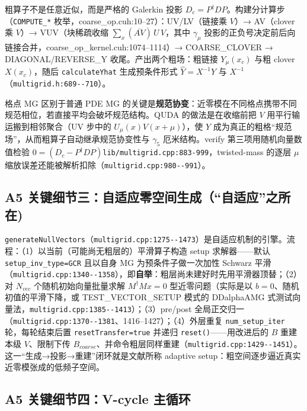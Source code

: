 \documentclass[UTF8]{ctexart}
\begin{document}
粗算子不是任意近似，而是严格的 Galerkin 投影 $D_c=P^\dagger D P$。构建分计算步（\texttt{COMPUTE\_*} 枚举，coarse\_op.cuh:10--27）：UV/LV（链接乘 $V$）→ AV（clover 乘 $V$）→ VUV（块稀疏收缩 $\sum_x (\overline{AV})\,U\,V$，其中 $\gamma_\mu$ 投影的正负号决定前后向链接合并，coarse\_op\_kernel.cuh:1074--1114）→ COARSE\_CLOVER → DIAGONAL/REVERSE\_Y 收尾。产出两个粗场：粗链接 $Y_\mu(x_c)$ 与粗 clover $X(x_c)$，随后 \texttt{calculateYhat} 生成预条件形式 $\hat Y=X^{-1}Y$ 与 $X^{-1}$（\textcolor{evidence}{\texttt{\nolinkurl{multigrid.h:689--710}}}）。

\textcolor{idea}{格点 MG 区别于普通 PDE MG 的关键是\textbf{规范协变}：近零模在不同格点携带不同规范相位，若直接平均会破坏规范结构。QUDA 的做法是在收缩前把 $V$ 用平行输运搬到相邻聚合（UV 步中的 $U_\mu(x)V(x+\mu)$），使 $Y$ 成为真正的粗格``规范场''，从而粗算子自动继承规范协变性与 $\gamma_5$ 厄米结构。}verify 第三项用随机向量数值检验 $0=(D_c-P^\dagger DP)$\textcolor{evidence}{\texttt{\nolinkurl{lib/multigrid.cpp:883-999}}}，twisted-mass 的逐层 $\mu$ 缩放误差还能被解析扣除（\textcolor{evidence}{\texttt{\nolinkurl{multigrid.cpp:980--991}}}）。

\subsection{A5 关键细节三：自适应零空间生成（``自适应''之所在)}

\texttt{generateNullVectors}（\textcolor{evidence}{\texttt{\nolinkurl{multigrid.cpp:1275--1473}}}）是自适应机制的引擎。流程：（1）以当前（可能尚无粗层的）平滑算子构造 setup 求解器——默认 \texttt{setup\_inv\_type=GCR} 且以自身 MG 为预条件子做一次加性 Schwarz 平滑（\textcolor{evidence}{\texttt{\nolinkurl{multigrid.cpp:1340--1358}}}），即\textbf{自举}：粗层尚未建好时先用平滑器顶替；（2）对 $N_{vec}$ 个随机初始向量批量求解 $M^\dagger M x=0$ 型近零问题（实际是以 $b=0$、随机初值的平滑下降，或 TEST\_VECTOR\_SETUP 模式的 DDalphaAMG 式测试向量法，\textcolor{evidence}{\texttt{\nolinkurl{multigrid.cpp:1385--1413}}}）；（3）pre/post 全局正交归一（\textcolor{evidence}{\texttt{\nolinkurl{multigrid.cpp:1370--1381}}}、1416--1427）；（4）外层重复 \texttt{num\_setup\_iter} 轮，每轮结束后置 \texttt{resetTransfer=true} 并递归 \texttt{reset()}——用改进后的 $B$ 重建本级 $V$、限制下传 $B_{coarse}$、并命令粗层同样重建（\textcolor{evidence}{\texttt{\nolinkurl{multigrid.cpp:1429--1451}}}）。这一``生成→投影→重建''闭环就是文献所称 adaptive setup：粗空间逐步逼近真实近零模张成的低频子空间。

\subsection{A5 关键细节四：V-cycle 主循环}
\end{document}
